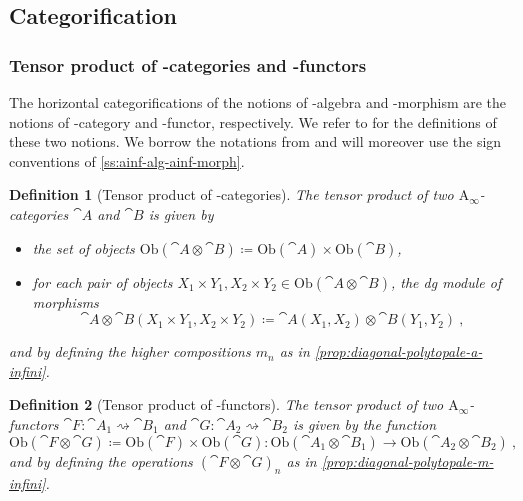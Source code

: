 \documentclass[twoside, 11pt]{amsart}
\newtheorem{definition}{Definition}[section]
\theoremstyle{remark}
\begin{document}
\subsection{Categorification}

\subsubsection{Tensor product of \Ainf -categories and \Ainf -functors}

The horizontal categorifications of the notions of \Ainf -algebra and \Ainf -morphism are the notions of \Ainf -category and \Ainf -functor, respectively. 
We refer to \cite[Chapter 1]{Seidel08} for the definitions of these two notions. 
We borrow the notations from \cite{Seidel08} and will moreover use the sign conventions of \cref{ss:ainf-alg-ainf-morph}. 

\begin{definition}[Tensor product of \Ainf -categories] \label{def:tensor-product-ainf-cat}
The \emph{tensor product} of two $\mathrm{A}_\infty$-categories $\cat{A}$ and $\cat{B}$ is given by 
\begin{itemize}[leftmargin=*]
  \item the set of objects $\mathrm{Ob}(\cat{A}\otimes \cat{B})\coloneqq \mathrm{Ob}(\cat{A})\times\mathrm{Ob}(\cat{B})$,
  \item for each pair of objects $X_1\times Y_1,X_2\times Y_2 \in \mathrm{Ob}(\cat{A}\otimes \cat{B})$, the dg module of morphisms \[\cat{A}\otimes \cat{B}(X_1\times Y_1,X_2\times Y_2)\coloneqq \cat{A}(X_1,X_2)\otimes\cat{B}(Y_1,Y_2) \ , \]
\end{itemize}
and by defining the higher compositions $m_n$ as in \cref{prop:diagonal-polytopale-a-infini}.
\end{definition}

\begin{samepage}
\begin{definition}[Tensor product of \Ainf -functors]
The \emph{tensor product} of two $\mathrm{A}_\infty$-functors $\cat{F}:\cat{A}_1 \rightsquigarrow \cat{B}_1$ and $\cat{G}:\cat{A}_2 \rightsquigarrow \cat{B}_2$ is given by the function 
\[ \mathrm{Ob}(\cat{F}\otimes \cat{G})\coloneqq \mathrm{Ob}(\cat{F})\times \mathrm{Ob}(\cat{G}) : \mathrm{Ob}(\cat{A}_1\otimes\cat{B}_1) \to \mathrm{Ob}(\cat{A}_2\otimes\cat{B}_2) \ , \]
and by defining the operations $(\cat{F} \otimes \cat{G})_n$ as in \cref{prop:diagonal-polytopale-m-infini}.
\end{definition}
\end{samepage}
\end{document}

